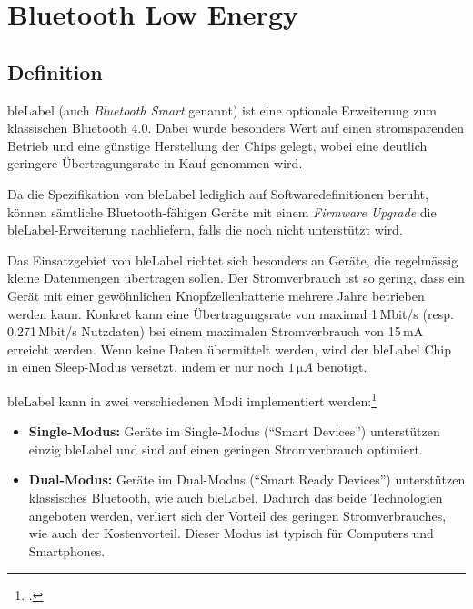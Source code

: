 \chapter{Bluetooth Low Energy}
\label{ch:ble}


\section{Definition}
\gls{bleLabel} (auch \textit{Bluetooth Smart} genannt) ist eine optionale Erweiterung zum klassischen Bluetooth 4.0.
Dabei wurde besonders Wert auf einen stromsparenden Betrieb und eine günstige Herstellung der Chips gelegt, wobei eine deutlich geringere Übertragungsrate in Kauf genommen wird.

Da die Spezifikation von \gls{bleLabel} lediglich auf Softwaredefinitionen beruht, können sämtliche Bluetooth-fähigen Geräte mit einem \textit{Firmware Upgrade} die \gls{bleLabel}-Erweiterung nachliefern, falls die noch nicht unterstützt wird.

Das Einsatzgebiet von \gls{bleLabel} richtet sich besonders an Geräte, die regelmässig kleine Datenmengen übertragen sollen.
Der Stromverbrauch ist so gering, dass ein Gerät mit einer gewöhnlichen Knopfzellenbatterie mehrere Jahre betrieben werden kann. Konkret kann eine Übertragungsrate von maximal 1\,Mbit/s (resp. 0.271\,Mbit/s Nutzdaten) bei einem maximalen Stromverbrauch von 15\,mA erreicht werden.
Wenn keine Daten übermittelt werden, wird der \gls{bleLabel} Chip in einen Sleep-Modus versetzt, indem er nur noch $1\,\si{\micro A}$ benötigt.

\gls{bleLabel} kann in zwei verschiedenen Modi implementiert werden:\footcite{Bluetooth_Low_Energy_vs_Classic_Bluetooth_Medical_Electronics_Design_2015-04-27}
\begin{itemize}
	\item \textbf{Single-Modus:} Geräte im Single-Modus ("`Smart Devices"') unterstützen einzig \gls{bleLabel} und sind auf einen geringen Stromverbrauch optimiert.
	\item \textbf{Dual-Modus:} Geräte im Dual-Modus ("`Smart Ready Devices"') unterstützen klassisches Bluetooth, wie auch \gls{bleLabel}. Dadurch das beide Technologien angeboten werden, verliert sich der Vorteil des geringen Stromverbrauches, wie auch der Kostenvorteil. Dieser Modus ist typisch für Computers und Smartphones.
\end{itemize}


